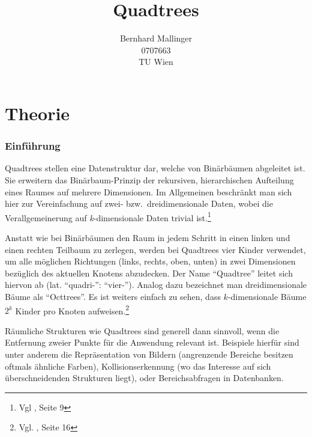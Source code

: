 \documentclass[%
			paper=a4,%
			DIV12,
			liststotoc,
			bibtotoc,
			draft=false,%
			titlepage,
			numbers=noendperiod
			]{scrartcl}
\title{Quadtrees}
\author{Bernhard Mallinger \\ 0707663 \\ TU Wien}
\newcommand{\zit}[3]{#1 \cite{#2}, #3}
\newcommand{\footzit}[3]{\footnote{\zit{#1}{#2}{#3}}}
\begin{document}
\maketitle

\tableofcontents 

\newpage

%
%
%
%
%
%
%
%
%


\part{Theorie}

\section{Einführung}
Quadtrees stellen eine Datenstruktur dar, welche von Binärbäumen abgeleitet ist.
Sie erweitern das Binärbaum-Prinzip der rekursiven, hierarchischen Aufteilung eines Raumes auf mehrere Dimensionen. 
Im Allgemeinen beschränkt man sich hier zur Vereinfachung auf zwei- bzw.\ dreidimensionale Daten, wobei die Verallgemeinerung auf \textit{k}-dimensionale Daten trivial ist.\footzit{Vgl}{DBLP:journals/acta/FinkelB74}{Seite 9}

Anstatt wie bei Binärbäumen den Raum in jedem Schritt in einen linken und einen rechten Teilbaum zu zerlegen, werden bei Quadtrees vier Kinder verwendet, um alle möglichen Richtungen (links, rechts, oben, unten) in zwei Dimensionen bezüglich des aktuellen Knotens abzudecken. Der Name "`Quadtree"' leitet sich hiervon ab (lat. "`quadri-"': "`vier-"'). 
Analog dazu bezeichnet man dreidimensionale Bäume als "`Octtrees"'. Es ist weiters einfach zu sehen, dass $k$-dimensionale Bäume $2^k$ Kinder pro Knoten aufweisen.\footzit{Vgl.}{Bentley:1979}{Seite 16}

Räumliche Strukturen wie Quadtrees sind generell dann sinnvoll, wenn die Entfernung zweier Punkte für die Anwendung relevant ist.
Beispiele hierfür sind unter anderem die Repräsentation von Bildern (angrenzende Bereiche besitzen oftmals ähnliche Farben), Kollisionserkennung (wo das Interesse auf sich überschneidenden Strukturen liegt), oder Bereichsabfragen in Datenbanken.
\end{document}
